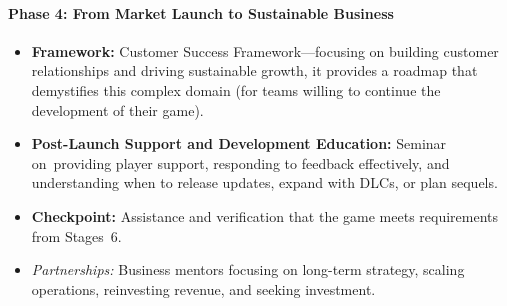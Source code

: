 \paragraph{\large Phase 4: From Market Launch to Sustainable Business}
\begin{itemize}
    \item \textbf{Framework:} Customer Success Framework---focusing on building customer relationships and driving sustainable growth, it provides a roadmap that demystifies this complex domain (for teams willing to continue the development of their game)\cite{gupta-customer-framework}.
    \item \textbf{Post-Launch Support and Development Education:} Seminar on~providing player support, responding to feedback effectively, and understanding when to release updates, expand with DLCs, or plan sequels.
    \item \textbf{Checkpoint:} Assistance and verification that the game meets requirements from Stages~6.
    \item \textit{Partnerships:} Business mentors focusing on long-term strategy, scaling operations, reinvesting revenue, and seeking investment.
\end{itemize}
